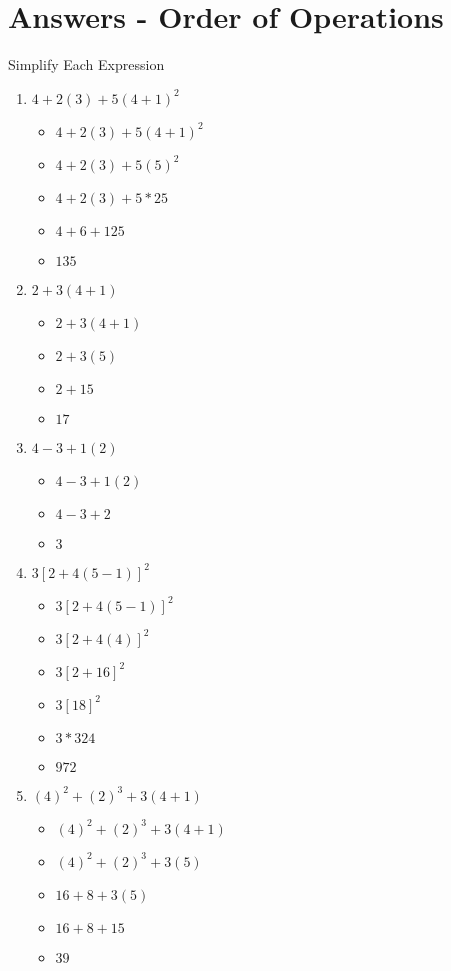 \documentclass{article}
\begin{document}
\section{Answers - Order of Operations}
Simplify Each Expression\\
\begin{enumerate}
\item $4+2(3)+5(4+1)^{2}$
  \begin{itemize}
  \item $4+2(3)+5(4+1)^{2}$
  \item $4+2(3)+5(5)^{2}$
  \item $4+2(3)+5*25$
  \item $4+6+125$
  \item $135$
  \end{itemize}
\item $2+3(4+1)$
  \begin{itemize}
  \item $2+3(4+1)$
  \item $2+3(5)$
  \item $2+15$
  \item $17$
  \end{itemize}
\item $4-3+1(2)$
  \begin{itemize}
  \item $4-3+1(2)$
  \item $4-3+2$
  \item $3$
  \end{itemize}
\item $3[2+4(5-1)]^{2}$
  \begin{itemize}
  \item $3[2+4(5-1)]^{2}$
  \item $3[2+4(4)]^{2}$
  \item $3[2+16]^{2}$
  \item $3[18]^{2}$
  \item $3*324$
  \item $972$
  \end{itemize}
\item $(4)^{2}+(2)^{3}+3(4+1)$
  \begin{itemize}
  \item $(4)^{2}+(2)^{3}+3(4+1)$
  \item $(4)^{2}+(2)^{3}+3(5)$
  \item $16+8+3(5)$
  \item $16+8+15$
  \item $39$
  \end{itemize}

\end{enumerate}
\end{document}

